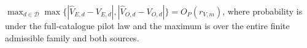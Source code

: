 \(\max_{d\in\mathcal D}\max\{|\widehat V_{E,d}-V_{E,d}|,|\widehat V_{O,d}-V_{O,d}|\}=O_P(r_{V,m})\), where probability is under the full-catalogue pilot law and the maximum is over the entire finite admissible family and both sources.